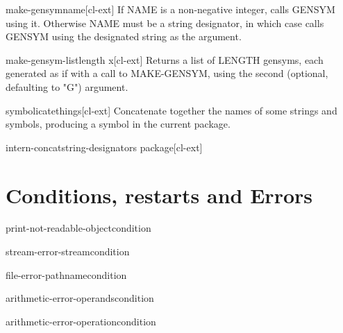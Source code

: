 \documentclass[10pt,english]{book}
\begin{document}
\begin{function}{make-gensym}{name}[cl-ext]
  If NAME is a non-negative integer, calls GENSYM using it. Otherwise NAME
must be a string designator, in which case calls GENSYM using the designated
string as the argument.
\end{function}

\begin{function}{make-gensym-list}{length \op x}[cl-ext]
  Returns a list of LENGTH gensyms, each generated as if with a call to MAKE-GENSYM,
using the second (optional, defaulting to "G") argument.
\end{function}

\begin{function}{symbolicate}{\rest things}[cl-ext]
  Concatenate together the names of some strings and symbols,
producing a symbol in the current package.
\end{function}

\begin{function}{intern-concat}{string-designators \op package}[cl-ext]
  
\end{function}


\chapter{Conditions, restarts and Errors}

\begin{function}{print-not-readable-object}{condition}
  
\end{function}

\begin{function}{stream-error-stream}{condition}
  
\end{function}

\begin{function}{file-error-pathname}{condition}
  
\end{function}

\begin{function}{arithmetic-error-operands}{condition}
  
\end{function}

\begin{function}{arithmetic-error-operation}{condition}
  
\end{function}
\end{document}
